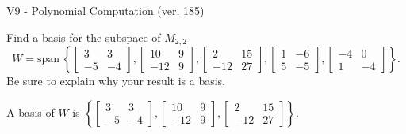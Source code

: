 \begin{exercise}
  \begin{exerciseTitle}V9 - Polynomial Computation (ver. 185)\end{exerciseTitle}
  \begin{exerciseStatement}
    Find a basis for the subspace of \(M_{2,2}\) 
\[W=\mathrm{span}\ \left\{\left[\begin{array}{cc}
3 & 3 \\
-5 & -4
\end{array}\right] , \left[\begin{array}{cc}
10 & 9 \\
-12 & 9
\end{array}\right] , \left[\begin{array}{cc}
2 & 15 \\
-12 & 27
\end{array}\right] , \left[\begin{array}{cc}
1 & -6 \\
5 & -5
\end{array}\right] , \left[\begin{array}{cc}
-4 & 0 \\
1 & -4
\end{array}\right]\right\}.\]
 Be sure to explain why your result is a basis.


  \end{exerciseStatement}
  \begin{exerciseAnswer}
   A basis of \(W\) is  \(\left\{\left[\begin{array}{cc}
3 & 3 \\
-5 & -4
\end{array}\right] , \left[\begin{array}{cc}
10 & 9 \\
-12 & 9
\end{array}\right] , \left[\begin{array}{cc}
2 & 15 \\
-12 & 27
\end{array}\right]\right\}\).
  


  \end{exerciseAnswer}
\end{exercise}